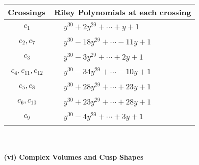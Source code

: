 \documentclass[1p]{elsarticle_modified}
\theoremstyle{definition}
\begin{document}
\begin{tabular}{m{50pt}|m{274pt}}
Crossings & \hspace{64pt}Riley Polynomials at each crossing \\
\hline $$\begin{aligned}c_{1}\end{aligned}$$&$\begin{aligned}
&y^{30}+2 y^{29}+\cdots+y+1
\end{aligned}$\\
\hline $$\begin{aligned}c_{2},c_{7}\end{aligned}$$&$\begin{aligned}
&y^{30}-18 y^{29}+\cdots-11 y+1
\end{aligned}$\\
\hline $$\begin{aligned}c_{3}\end{aligned}$$&$\begin{aligned}
&y^{30}-3 y^{29}+\cdots+2 y+1
\end{aligned}$\\
\hline $$\begin{aligned}c_{4},c_{11},c_{12}\end{aligned}$$&$\begin{aligned}
&y^{30}-34 y^{29}+\cdots-10 y+1
\end{aligned}$\\
\hline $$\begin{aligned}c_{5},c_{8}\end{aligned}$$&$\begin{aligned}
&y^{30}+28 y^{29}+\cdots+23 y+1
\end{aligned}$\\
\hline $$\begin{aligned}c_{6},c_{10}\end{aligned}$$&$\begin{aligned}
&y^{30}+23 y^{29}+\cdots+28 y+1
\end{aligned}$\\
\hline $$\begin{aligned}c_{9}\end{aligned}$$&$\begin{aligned}
&y^{30}-4 y^{29}+\cdots+3 y+1
\end{aligned}$\\
\hline
\end{tabular}\\~\\
\newpage\flushleft \textbf{(vi) Complex Volumes and Cusp Shapes}
\end{document}
